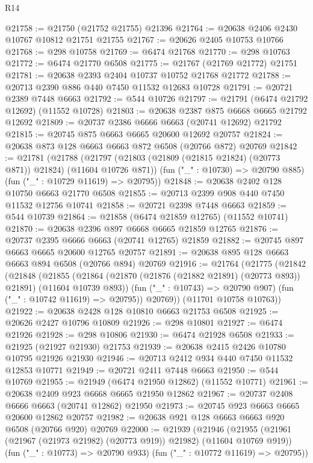 \begin{lexlean}{R14}
\begin{coremodule}
@21758 := @21750 (@21752 @21755) @21396
@21764 := @20638 @2406 @2430 @10767 @10812 @21751 @21755
@21767 := @20626 @2405 @10753 @10766
@21768 := @298 @10758
@21769 := @6474 @21768
@21770 := @298 @10763
@21772 := @6474 @21770 @6508
@21775 := @21767 (@21769 @21772) @21751
@21781 := @20638 @2393 @2404 @10737 @10752 @21768 @21772
@21788 := @20713 @2390 @886 @440 @7450 @11532 @12683 @10728
@21791 := @20721 @2389 @7448 @6663
@21792 := @544 @10726
@21797 := @21791 (@6474 @21792 @12692) (@11552 @10728)
@21803 := @20638 @2387 @875 @6668 @6665 @21792 @12692
@21809 := @20737 @2386 @6666 @6663 (@20741 @12692) @21792
@21815 := @20745 @875 @6663 @6665 @20600 @12692 @20757
@21824 := @20638 @873 @128 @6663 @6663 @872 @6508 (@20766 @872) @20769
@21842 := @21781
    (@21788
      (@21797 (@21803 (@21809 (@21815 @21824) (@20773 @871)) @21824) (@11604 @10726 @871))
      (fun ("_" : @10730) => @20790 @885)
      (fun ("_" : @10729 @11619) => @20795))
@21848 := @20638 @2402 @128 @10750 @6663 @21770 @6508
@21855 := @20713 @2399 @908 @440 @7450 @11532 @12756 @10741
@21858 := @20721 @2398 @7448 @6663
@21859 := @544 @10739
@21864 := @21858 (@6474 @21859 @12765) (@11552 @10741)
@21870 := @20638 @2396 @897 @6668 @6665 @21859 @12765
@21876 := @20737 @2395 @6666 @6663 (@20741 @12765) @21859
@21882 := @20745 @897 @6663 @6665 @20600 @12765 @20757
@21891 := @20638 @895 @128 @6663 @6663 @894 @6508 (@20766 @894) @20769
@21916 := @21764
    (@21775
      (@21842
        (@21848
          (@21855
            (@21864 (@21870 (@21876 (@21882 @21891) (@20773 @893)) @21891) (@11604 @10739 @893))
            (fun ("_" : @10743) => @20790 @907)
            (fun ("_" : @10742 @11619) => @20795))
          @20769))
      (@11701 @10758 @10763))
@21922 := @20638 @2428 @128 @10810 @6663 @21753 @6508
@21925 := @20626 @2427 @10796 @10809
@21926 := @298 @10801
@21927 := @6474 @21926
@21928 := @298 @10806
@21930 := @6474 @21928 @6508
@21933 := @21925 (@21927 @21930) @21753
@21939 := @20638 @2415 @2426 @10780 @10795 @21926 @21930
@21946 := @20713 @2412 @934 @440 @7450 @11532 @12853 @10771
@21949 := @20721 @2411 @7448 @6663
@21950 := @544 @10769
@21955 := @21949 (@6474 @21950 @12862) (@11552 @10771)
@21961 := @20638 @2409 @923 @6668 @6665 @21950 @12862
@21967 := @20737 @2408 @6666 @6663 (@20741 @12862) @21950
@21973 := @20745 @923 @6663 @6665 @20600 @12862 @20757
@21982 := @20638 @921 @128 @6663 @6663 @920 @6508 (@20766 @920) @20769
@22000 := @21939
    (@21946
      (@21955 (@21961 (@21967 (@21973 @21982) (@20773 @919)) @21982) (@11604 @10769 @919))
      (fun ("_" : @10773) => @20790 @933)
      (fun ("_" : @10772 @11619) => @20795))

\end{coremodule}
\end{lexlean}
